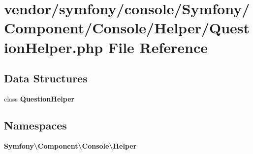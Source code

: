 \section{vendor/symfony/console/\+Symfony/\+Component/\+Console/\+Helper/\+Question\+Helper.php File Reference}
\label{_question_helper_8php}
\subsection*{Data Structures}
\begin{DoxyCompactItemize}
\item 
class {\bf Question\+Helper}
\end{DoxyCompactItemize}
\subsection*{Namespaces}
\begin{DoxyCompactItemize}
\item 
 {\bf Symfony\textbackslash{}\+Component\textbackslash{}\+Console\textbackslash{}\+Helper}
\end{DoxyCompactItemize}
